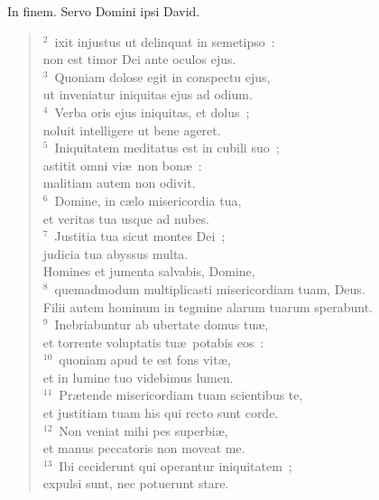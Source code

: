 \bchapter[Psalm]
In finem. Servo Domini ipsi David.
\begin{verse}${}^{2}$~ixit injustus ut delinquat in semetipso~:\\ non est timor Dei ante oculos ejus.\\
${}^{3}$~Quoniam dolose egit in conspectu ejus,\\ ut inveniatur iniquitas ejus ad odium.\\
${}^{4}$~Verba oris ejus iniquitas, et dolus~;\\ noluit intelligere ut bene ageret.\\
${}^{5}$~Iniquitatem meditatus est in cubili suo~;\\ astitit omni vi\ae\ non bon\ae~:\\ malitiam autem non odivit.\\
${}^{6}$~Domine, in c\ae lo misericordia tua,\\ et veritas tua usque ad nubes.\\
${}^{7}$~Justitia tua sicut montes Dei~;\\ judicia tua abyssus multa.\\ Homines et jumenta salvabis, Domine,\\
${}^{8}$~quemadmodum multiplicasti misericordiam tuam, Deus.\\ Filii autem hominum in tegmine alarum tuarum sperabunt.\\
${}^{9}$~Inebriabuntur ab ubertate domus tu\ae ,\\ et torrente voluptatis tu\ae\ potabis eos~:\\
${}^{10}$~quoniam apud te est fons vit\ae ,\\ et in lumine tuo videbimus lumen.\\
${}^{11}$~Pr\ae tende misericordiam tuam scientibus te,\\ et justitiam tuam his qui recto sunt corde.\\
${}^{12}$~Non veniat mihi pes superbi\ae ,\\ et manus peccatoris non moveat me.\\
${}^{13}$~Ibi ceciderunt qui operantur iniquitatem~;\\ expulsi sunt, nec potuerunt stare.\end{verse}



